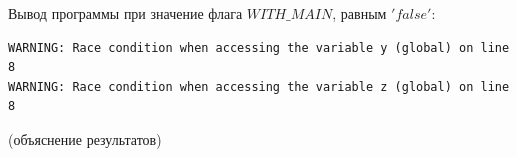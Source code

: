 Вывод программы при значение флага $WITH\_MAIN$, равным $'false'$:
\begin{verbatim}
WARNING: Race condition when accessing the variable y (global) on line 8
WARNING: Race condition when accessing the variable z (global) on line 8
\end{verbatim}
(объяснение результатов)





% 
